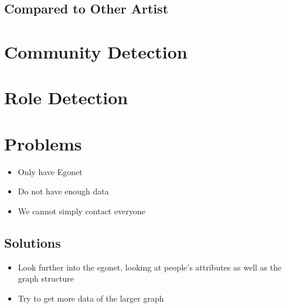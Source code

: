 \documentclass[11pt]{beamer}
\begin{document}
\subsection*{Compared to Other Artist}
\label{sec:org77ba0f0}
\section*{Community Detection}
\label{sec:orgb53a031}
\section*{Role Detection}
\label{sec:orgbe3f63f}
\section*{Problems}
\label{sec:orgbc4c822}
\begin{itemize}
\item Only have Egonet
\item Do not have enough data
\item We cannot simply contact everyone
\end{itemize}

\subsection*{Solutions}
\label{sec:org524f2d0}
\begin{itemize}
\item Look further into the egonet, looking at people's attributes as well as the graph structure
\item Try to get more data of the larger graph
\end{itemize}
\end{document}
